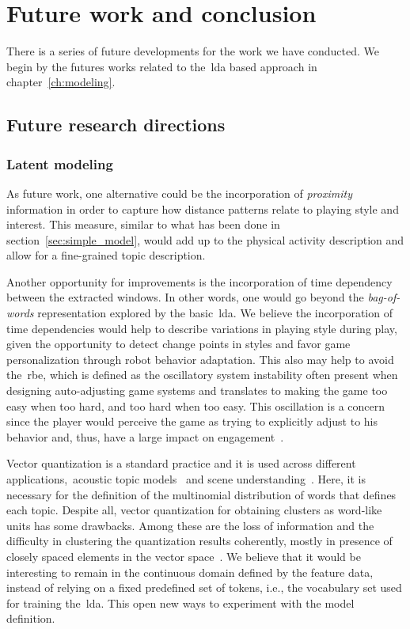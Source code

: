 \chapter{Future work and conclusion}\label{ch:future}

There is a series of future developments for the work we have conducted. We begin by the futures works related to the~\gls{lda} based approach in chapter~\ref{ch:modeling}.

\section{Future research directions}
\subsection{Latent modeling}\label{sec:future_lda}
As future work, one alternative could be the incorporation of \textit{proximity} information in order to capture how distance patterns relate to playing style and interest. This measure, similar to what has been done in section~\ref{sec:simple_model}, would add up to the physical activity description and allow for a fine-grained topic description.

Another opportunity for improvements is the incorporation of time dependency between the extracted windows. In other words, one would go beyond the \textit{bag-of-words} representation explored by the basic~\gls{lda}. We believe the incorporation of time dependencies would help to describe variations in playing style during play, given the opportunity to detect change points in styles and favor game personalization through robot behavior adaptation. This also may help to avoid the~\gls{rbe}, which is defined as the oscillatory system instability often present when designing auto-adjusting game systems and translates to making the game too easy when too hard, and too hard when too easy. This oscillation is a concern since the player would perceive the game as trying to explicitly adjust to his behavior and, thus, have a large impact on engagement~\citep{martinoia_physically_2013}.

Vector quantization is a standard practice and it is used across different applications,~\eg acoustic topic models~\citep{kim_acoustic_2009,kim_audio_2009} and scene understanding~\citep{cao_spatially_2007,li_towards_2009,niu_context_2012}. Here, it is necessary for the definition of the multinomial distribution of words that defines each topic. Despite all, vector quantization for obtaining clusters as word-like units has some drawbacks. Among these are the loss of information and the difficulty in clustering the quantization results coherently, mostly in presence of closely spaced elements in the vector space~\citep{hu_latent_2012}.
We believe that it would be interesting to remain in the continuous domain defined by the feature data, instead of relying on a fixed predefined set of tokens, i.e., the vocabulary set used for training the~\gls{lda}. This open new ways to experiment with the model definition.

